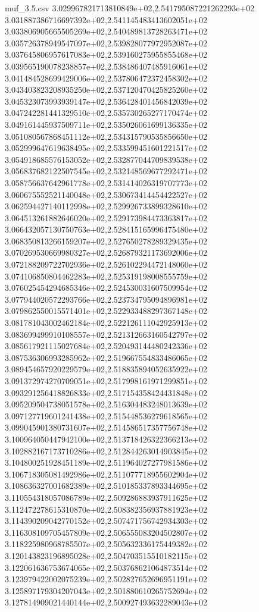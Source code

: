 \begin{filecontents*}{muf_3.5.csv}
3.029967821713810849e+02,2.541795087221262293e+02
3.031887386716697392e+02,2.541145483413602051e+02
3.033806905665505269e+02,2.540489813728263471e+02
3.035726378949547097e+02,2.539828077972952087e+02
3.037645806957617083e+02,2.539160275955855468e+02
3.039565190078238857e+02,2.538486407485916061e+02
3.041484528699429006e+02,2.537806472372458302e+02
3.043403823208935250e+02,2.537120470425825260e+02
3.045323073993939147e+02,2.536428401456842039e+02
3.047242281441329510e+02,2.535730265277170474e+02
3.049161445937509711e+02,2.535026061699136335e+02
3.051080567868451112e+02,2.534315790535856650e+02
3.052999647619638495e+02,2.533599451601221517e+02
3.054918685576153052e+02,2.532877044709839538e+02
3.056837682122507545e+02,2.532148569677292471e+02
3.058756637642961778e+02,2.531414026319707773e+02
3.060675552521140048e+02,2.530673414454422527e+02
3.062594427140112998e+02,2.529926733899328610e+02
3.064513261882646020e+02,2.529173984473363817e+02
3.066432057130750763e+02,2.528415165996475480e+02
3.068350813266159207e+02,2.527650278289329435e+02
3.070269530669980327e+02,2.526879321173692006e+02
3.072188209722702936e+02,2.526102294472148060e+02
3.074106850804462283e+02,2.525319198008555759e+02
3.076025454294685346e+02,2.524530031607509954e+02
3.077944020572293766e+02,2.523734795094896981e+02
3.079862550015571401e+02,2.522933488297367148e+02
3.081781043002462184e+02,2.522126111042925913e+02
3.083699499910108557e+02,2.521312663160542797e+02
3.085617921115027684e+02,2.520493144480242336e+02
3.087536306993285962e+02,2.519667554833486065e+02
3.089454657920229579e+02,2.518835894052635922e+02
3.091372974270709051e+02,2.517998161971299851e+02
3.093291256418826833e+02,2.517154358424431848e+02
3.095209504738051578e+02,2.516304483248013639e+02
3.097127719601241438e+02,2.515448536279618565e+02
3.099045901380731607e+02,2.514586517357756748e+02
3.100964050447942100e+02,2.513718426322366213e+02
3.102882167173710286e+02,2.512844263014903845e+02
3.104800251928451189e+02,2.511964027277981586e+02
3.106718305081492986e+02,2.511077718955602904e+02
3.108636327001682389e+02,2.510185337893344695e+02
3.110554318057086789e+02,2.509286883937911625e+02
3.112472278615310870e+02,2.508382356937881923e+02
3.114390209042770152e+02,2.507471756742934303e+02
3.116308109705457809e+02,2.506555083204502807e+02
3.118225980968785507e+02,2.505632336175449382e+02
3.120143823196895028e+02,2.504703515510182115e+02
3.122061636753674065e+02,2.503768621064873514e+02
3.123979422002075239e+02,2.502827652696951191e+02
3.125897179304207043e+02,2.501880610265752694e+02
3.127814909021440144e+02,2.500927493632289043e+02

\end{filecontents*}
